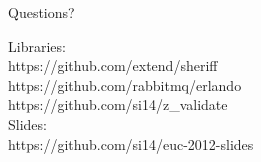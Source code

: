 \documentclass[10pt]{beamer}
\begin{document}
\begin{frame}\label{lastframe}
  \begin{center}
    \Large
    Questions?\\\vspace{15pt}
  \end{center}
  Libraries:\\
  https://github.com/extend/sheriff\\
  https://github.com/rabbitmq/erlando\\
  https://github.com/si14/z\_validate\\
  Slides:\\
  https://github.com/si14/euc-2012-slides
\end{frame}
\end{document}
